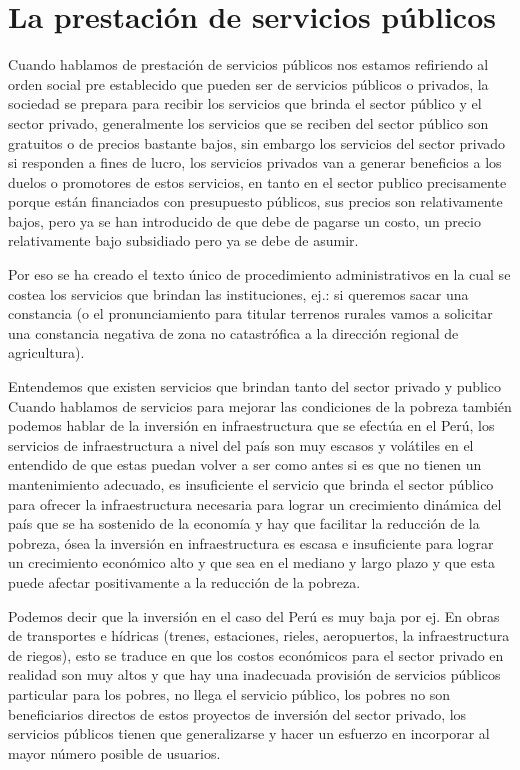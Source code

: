\documentclass[
  a4paper,
]{article}
\begin{document}
\section{La prestación de servicios
públicos}\label{la-prestaciuxf3n-de-servicios-puxfablicos}

Cuando hablamos de prestación de servicios públicos nos estamos
refiriendo al orden social pre establecido que pueden ser de servicios
públicos o privados, la sociedad se prepara para recibir los servicios
que brinda el sector público y el sector privado, generalmente los
servicios que se reciben del sector público son gratuitos o de precios
bastante bajos, sin embargo los servicios del sector privado si
responden a fines de lucro, los servicios privados van a generar
beneficios a los duelos o promotores de estos servicios, en tanto en el
sector publico precisamente porque están financiados con presupuesto
públicos, sus precios son relativamente bajos, pero ya se han
introducido de que debe de pagarse un costo, un precio relativamente
bajo subsidiado pero ya se debe de asumir.

Por eso se ha creado el texto único de procedimiento administrativos en
la cual se costea los servicios que brindan las instituciones, ej.: si
queremos sacar una constancia (o el pronunciamiento para titular
terrenos rurales vamos a solicitar una constancia negativa de zona no
catastrófica a la dirección regional de agricultura).

Entendemos que existen servicios que brindan tanto del sector privado y
publico Cuando hablamos de servicios para mejorar las condiciones de la
pobreza también podemos hablar de la inversión en infraestructura que se
efectúa en el Perú, los servicios de infraestructura a nivel del país
son muy escasos y volátiles en el entendido de que estas puedan volver a
ser como antes si es que no tienen un mantenimiento adecuado, es
insuficiente el servicio que brinda el sector público para ofrecer la
infraestructura necesaria para lograr un crecimiento dinámica del país
que se ha sostenido de la economía y hay que facilitar la reducción de
la pobreza, ósea la inversión en infraestructura es escasa e
insuficiente para lograr un crecimiento económico alto y que sea en el
mediano y largo plazo y que esta puede afectar positivamente a la
reducción de la pobreza.

Podemos decir que la inversión en el caso del Perú es muy baja por ej.
En obras de transportes e hídricas (trenes, estaciones, rieles,
aeropuertos, la infraestructura de riegos), esto se traduce en que los
costos económicos para el sector privado en realidad son muy altos y que
hay una inadecuada provisión de servicios públicos particular para los
pobres, no llega el servicio público, los pobres no son beneficiarios
directos de estos proyectos de inversión del sector privado, los
servicios públicos tienen que generalizarse y hacer un esfuerzo en
incorporar al mayor número posible de usuarios.
\end{document}

